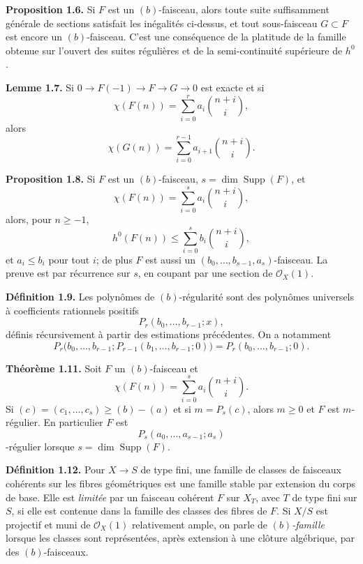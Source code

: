 \documentclass[11pt]{article}
\begin{document}
\textbf{Proposition 1.6.} Si $F$ est un $(b)$-faisceau, alors toute suite suffisamment g\'en\'erale de sections satisfait les in\'egalit\'es ci-dessus, et tout sous-faisceau $G\subset F$ est encore un $(b)$-faisceau. C'est une cons\'equence de la platitude de la famille obtenue sur l'ouvert des suites r\'eguli\`eres et de la semi-continuit\'e sup\'erieure de $h^0$.

\textbf{Lemme 1.7.} Si $0\to F(-1)\to F\to G\to0$ est exacte et si
\[
 \chi(F(n))=\sum_{i=0}^r a_i\binom{n+i}{i},
\]
alors
\[
 \chi(G(n))=\sum_{i=0}^{r-1}a_{i+1}\binom{n+i}{i}.
\]

\textbf{Proposition 1.8.} Si $F$ est un $(b)$-faisceau, $s=\dim\operatorname{Supp}(F)$, et
\[
 \chi(F(n))=\sum_{i=0}^s a_i\binom{n+i}{i},
\]
alors, pour $n\ge-1$,
\[
 h^0(F(n))\le \sum_{i=0}^s b_i\binom{n+i}{i},
\]
et $a_i\le b_i$ pour tout $i$; de plus $F$ est aussi un $(b_0,\ldots,b_{s-1},a_s)$-faisceau. La preuve est par r\'ecurrence sur $s$, en coupant par une section de $\mathcal O_X(1)$.

\textbf{D\'efinition 1.9.} Les polyn\^omes de $(b)$-r\'egularit\'e sont des polyn\^omes universels \`a coefficients rationnels positifs
\[
 P_r(b_0,\ldots,b_{r-1};x),
\]
d\'efinis r\'ecursivement \`a partir des estimations pr\'ec\'edentes. On a notamment
\[
 P_r\bigl(b_0,\ldots,b_{r-1};P_{r-1}(b_1,\ldots,b_{r-1};0)\bigr)=P_r(b_0,\ldots,b_{r-1};0).
\]

\textbf{Th\'eor\`eme 1.11.} Soit $F$ un $(b)$-faisceau et
\[
 \chi(F(n))=\sum_{i=0}^s a_i\binom{n+i}{i}.
\]
Si $(c)=(c_1,\ldots,c_s)\ge(b)-(a)$ et si $m=P_s(c)$, alors $m\ge0$ et $F$ est $m$-r\'egulier. En particulier $F$ est
\[
 P_s(a_0,\ldots,a_{s-1};a_s)
\]
-r\'egulier lorsque $s=\dim\operatorname{Supp}(F)$.

\textbf{D\'efinition 1.12.} Pour $X\to S$ de type fini, une famille de classes de faisceaux coh\'erents sur les fibres g\'eom\'etriques est une famille stable par extension du corps de base. Elle est \emph{limit\'ee} par un faisceau coh\'erent $F$ sur $X_T$, avec $T$ de type fini sur $S$, si elle est contenue dans la famille des classes des fibres de $F$. Si $X/S$ est projectif et muni de $\mathcal O_X(1)$ relativement ample, on parle de \emph{$(b)$-famille} lorsque les classes sont repr\'esent\'ees, apr\`es extension \`a une cl\^oture alg\'ebrique, par des $(b)$-faisceaux.
\end{document}
